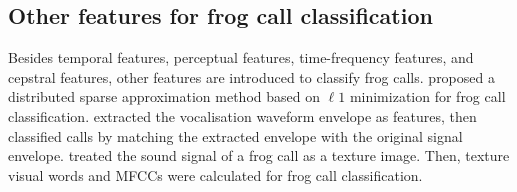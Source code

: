 \subsection{Other features for frog call classification}
Besides temporal features, perceptual features, time-frequency features, and cepstral features, other features are introduced to classify frog calls.
\cite{wei2012distributed} proposed a distributed sparse approximation method based on $\ell 1$ minimization for frog call classification.  \cite{dang2008lightweight} extracted the vocalisation waveform envelope as features, then classified calls by matching the extracted envelope with the original signal envelope. \cite{kular2015classifying} treated the sound signal of a frog call as a texture image. Then, texture visual words and MFCCs were calculated for frog call classification. 





